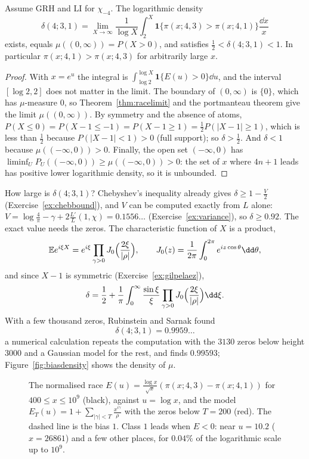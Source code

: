 \begin{corollary}\label{cor:biasdensity}
Assume GRH and LI for $\chi_{-4}$. The logarithmic density
\[
\delta(4;3,1)=\lim_{X\to\infty}\frac1{\log X}\int_2^X\mathbf 1\{\pi(x;4,3)>\pi(x;4,1)\}\frac{\dd x}x
\]
exists, equals $\mu((0,\infty))=P(X>0)$, and satisfies $\frac12<\delta(4;3,1)<1$. In particular $\pi(x;4,1)>\pi(x;4,3)$ for arbitrarily large $x$.
\end{corollary}
\begin{proof}
With $x=e^u$ the integral is $\int_{\log2}^{\log X}\mathbf 1\{E(u)>0\}\dd u$, and the interval $[\log2,2]$ does not matter in the limit. The boundary of $(0,\infty)$ is $\{0\}$, which has $\mu$-measure $0$, so Theorem~\ref{thm:racelimit} and the portmanteau theorem give the limit $\mu((0,\infty))$. By symmetry and the absence of atoms, $P(X\le0)=P(X-1\le-1)=P(X-1\ge1)=\frac12P(|X-1|\ge1)$, which is less than $\frac12$ because $P(|X-1|<1)>0$ (full support); so $\delta>\frac12$. And $\delta<1$ because $\mu((-\infty,0))>0$. Finally, the open set $(-\infty,0)$ has $\liminf_U P_U((-\infty,0))\ge\mu((-\infty,0))>0$: the set of $x$ where $4n+1$ leads has positive lower logarithmic density, so it is unbounded.
\end{proof}

How large is $\delta(4;3,1)$? Chebyshev's inequality already gives $\delta\ge1-\frac V2$ (Exercise~\ref{ex:chebbound}), and $V$ can be computed exactly from $L$ alone: $V=\log\frac4\pi-\gamma+2\frac{L'}L(1,\chi)=0.1556\ldots$ (Exercise~\ref{ex:variance}), so $\delta\ge0.92$. The exact value needs the zeros. The characteristic function of $X$ is a product,
\[
\mathbb Ee^{i\xi X}=e^{i\xi}\prod_{\gamma>0}J_0\Bigl(\frac{2\xi}{|\rho|}\Bigr),\qquad J_0(z)=\frac1{2\pi}\int_0^{2\pi}e^{iz\cos\theta}\dd\theta,
\]
and since $X-1$ is symmetric (Exercise~\ref{ex:gilpelaez}),
\[
\delta=\frac12+\frac1\pi\int_0^\infty\frac{\sin\xi}\xi\prod_{\gamma>0}J_0\Bigl(\frac{2\xi}{|\rho|}\Bigr)\dd\xi.
\] With a few thousand zeros, Rubinstein and Sarnak found
\[
\delta(4;3,1)=0.9959\ldots
\]
a numerical calculation repeats the computation with the $3130$ zeros below height $3000$ and a Gaussian model for the rest, and finds $0.99593$; Figure~\ref{fig:biasdensity} shows the density of $\mu$.

\begin{figure}[ht]
\centering{}
\caption{The normalised race $E(u)=\frac{\log x}{\sqrt x}(\pi(x;4,3)-\pi(x;4,1))$ for $400\le x\le10^9$ (black), against $u=\log x$, and the model $E_T(u)=1+\sum_{|\gamma|<T}\frac{x^{i\gamma}}\rho$ with the zeros below $T=200$ (red). The dashed line is the bias $1$. Class $1$ leads when $E<0$: near $u=10.2$ ($x=26861$) and a few other places, for $0.04\%$ of the logarithmic scale up to $10^9$.}
\label{fig:race}
\end{figure}

